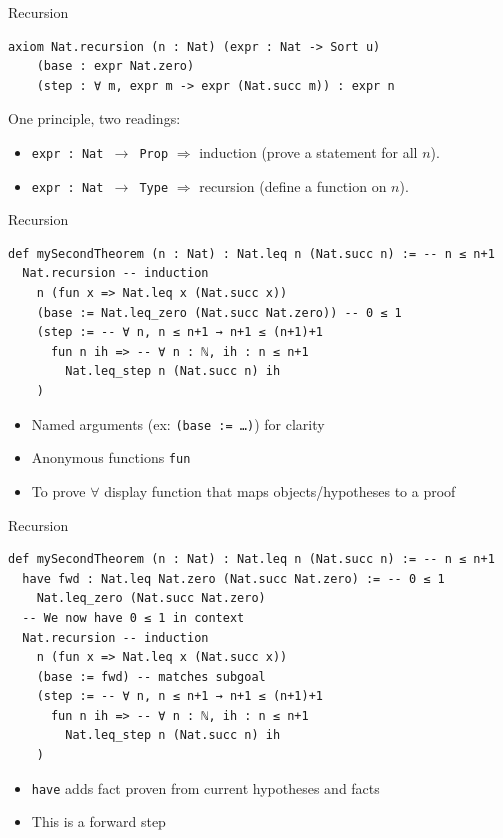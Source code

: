 \documentclass[aspectratio=169]{beamer}
\begin{document}
\begin{frame}[fragile]{Recursion}
\begin{lstlisting}
axiom Nat.recursion (n : Nat) (expr : Nat -> Sort u)
	(base : expr Nat.zero)
	(step : ∀ m, expr m -> expr (Nat.succ m)) : expr n
\end{lstlisting}
One principle, two readings:
\begin{itemize}
	\item \texttt{expr : Nat $\to$ \alert{Prop}} $\Rightarrow$
	\alert{induction} (prove a statement for all $n$).
	\item \texttt{expr : Nat $\to$ \alert{Type}} $\Rightarrow$
	\alert{recursion} (define a function on $n$).
\end{itemize}
\end{frame}

\begin{frame}[fragile]{Recursion}
	\begin{lstlisting}
def mySecondTheorem (n : Nat) : Nat.leq n (Nat.succ n) := -- n ≤ n+1
  Nat.recursion -- induction
    n (fun x => Nat.leq x (Nat.succ x))
	(base := Nat.leq_zero (Nat.succ Nat.zero)) -- 0 ≤ 1
	(step := -- ∀ n, n ≤ n+1 → n+1 ≤ (n+1)+1
	  fun n ih => -- ∀ n : ℕ, ih : n ≤ n+1
		Nat.leq_step n (Nat.succ n) ih
	)
	\end{lstlisting}
\begin{itemize}
	\item Named arguments (ex: \texttt{(base := \ldots)}) for clarity
	\item Anonymous functions \texttt{fun}
	\item To prove $\forall$ display function that maps objects/hypotheses to a proof
\end{itemize}
\end{frame}

\begin{frame}[fragile]{Recursion}
\begin{lstlisting}
def mySecondTheorem (n : Nat) : Nat.leq n (Nat.succ n) := -- n ≤ n+1
  have fwd : Nat.leq Nat.zero (Nat.succ Nat.zero) := -- 0 ≤ 1
    Nat.leq_zero (Nat.succ Nat.zero)
  -- We now have 0 ≤ 1 in context
  Nat.recursion -- induction
	n (fun x => Nat.leq x (Nat.succ x))
	(base := fwd) -- matches subgoal
	(step := -- ∀ n, n ≤ n+1 → n+1 ≤ (n+1)+1
	  fun n ih => -- ∀ n : ℕ, ih : n ≤ n+1
		Nat.leq_step n (Nat.succ n) ih
	)
\end{lstlisting}
\begin{itemize}
	\item \texttt{have} adds fact proven from current hypotheses and facts
	\item This is a \alert{forward step}
\end{itemize}
\end{frame}
\end{document}
